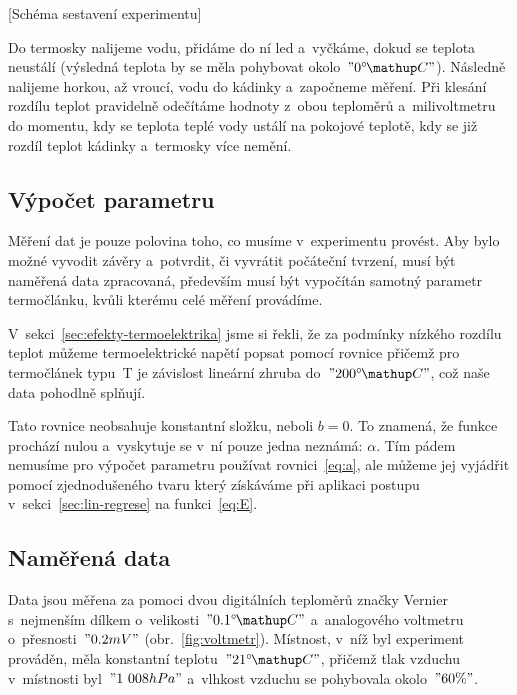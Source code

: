 [Schéma sestavení experimentu]

Do termosky nalijeme vodu, přidáme do ní led a~vyčkáme, dokud se teplota
neustálí (výsledná teplota by se měla pohybovat okolo~$"0 \C"$). Následně
nalijeme horkou, až vroucí, vodu do kádinky a~započneme měření. Při klesání
rozdílu teplot pravidelně odečítáme hodnoty z~obou teploměrů a~milivoltmetru
do momentu, kdy se teplota teplé vody ustálí na pokojové teplotě, kdy se
již rozdíl teplot kádinky a~termosky více nemění.


\subsection{Výpočet parametru}
Měření dat je pouze polovina toho, co musíme v~experimentu provést. Aby bylo
možné vyvodit závěry a~potvrdit, či vyvrátit počáteční tvrzení, musí být
naměřená data zpracovaná,
především musí být vypočítán samotný parametr termočlánku, kvůli kterému
celé měření provádíme.

V~sekci~\ref{sec:efekty-termoelektrika} jsme si řekli, že za podmínky nízkého
rozdílu teplot můžeme termoelektrické napětí popsat pomocí rovnice
přičemž pro termočlánek typu~T je závislost lineární zhruba do~$"200 \C"$, což
naše data pohodlně splňují.~\cite{thermocoupleinfo}

Tato rovnice neobsahuje konstantní složku, neboli $b=0$. To znamená, že funkce
prochází nulou a~vyskytuje se v~ní pouze jedna neznámá: $\alpha$. Tím pádem
nemusíme pro výpočet parametru používat rovnici~\eqref{eq:a}, ale můžeme jej
vyjádřit pomocí zjednodušeného tvaru
který získáváme při aplikaci postupu v~sekci~\ref{sec:lin-regrese} na 
funkci~\eqref{eq:E}. 


\subsection{Naměřená data}
Data jsou měřena za pomoci dvou digitálních teploměrů značky Vernier
s~nejmenším dílkem o~velikosti~$"0.1 \C"$ a~analogového voltmetru
o~přesnosti~$"0.2 mV"$ (obr.~\ref{fig:voltmetr}).
Místnost, v~níž byl experiment prováděn, měla konstantní teplotu~$"21 \C"$,
přičemž tlak vzduchu v~místnosti byl~$"1~008 hPa"$ a~vlhkost vzduchu se
pohybovala okolo~$"60 \%"$.

